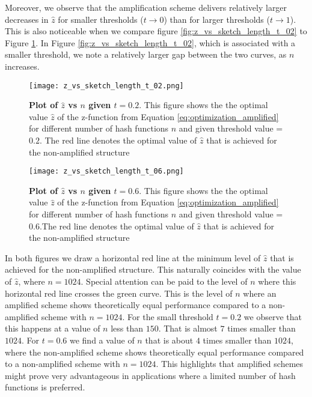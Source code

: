 Moreover, we observe that the amplification scheme delivers relatively larger decreases in $\hat{z}$ for smaller thresholds ($t \rightarrow 0$) than for larger thresholds ($t \rightarrow 1$).  This is also noticeable when we compare figure \ref{fig:z_vs_sketch_length_t_02} to Figure \ref{fig:z_vs_sketch_length_t_06}. In Figure \ref{fig:z_vs_sketch_length_t_02}, which is associated with a smaller threshold, we note a relatively larger gap between the two curves, as $n$ increases.
\begin{figure}
    \centering
    \begin{minipage}[b]{0.49\textwidth}
    \texttt{[image: z\_vs\_sketch\_length\_t\_02.png]}
    \caption[Plot of $\hat{z}$ vs $n$ given $t=0.2$]{\textbf{Plot of $\hat{z}$ vs $n$ given $t=0.2$}. This figure shows the the optimal value $\hat{z}$ of the z-function from Equation \ref{eq:optimization_amplified} for different number of hash functions $n$ and given threshold value = $0.2$. The red line denotes the optimal value of $\hat{z}$ that is achieved for the non-amplified structure}
    \label{fig:z_vs_sketch_length_t_02}
    \end{minipage}
    \hfill 
    \begin{minipage}[b]{0.49\textwidth}
    \texttt{[image: z\_vs\_sketch\_length\_t\_06.png]}
    \caption[Plot of $\hat{z}$ vs $n$ given $t=0.6$]{\textbf{Plot of $\hat{z}$ vs $n$ given $t=0.6$}. This figure shows the the optimal value $\hat{z}$ of the z-function from Equation \ref{eq:optimization_amplified} for different number of hash functions $n$ and given threshold value = $0.6$.The red line denotes the optimal value of $\hat{z}$ that is achieved for the non-amplified structure}
    \label{fig:z_vs_sketch_length_t_06}
\end{minipage}
\end{figure}

In both figures we draw a horizontal red line at the minimum level of $\hat{z}$ that is achieved for the non-amplified structure. This naturally coincides with the value of $\hat{z}$, where $n=1024$. Special attention can be paid to the level of $n$ where this horizontal red line crosses the green curve. This is the level of $n$ where an amplified scheme shows theoretically equal performance compared to a non-amplified scheme with $n=1024$. For the small threshold $t=0.2$ we observe that this happens at a value of $n$ less than $150$. That is almost $7$ times smaller than $1024$. For $t=0.6$ we find a value of $n$ that is about $4$ times smaller than $1024$, where the non-amplified scheme shows theoretically equal performance compared to a non-amplified scheme with $n=1024$. This highlights that amplified schemes might prove very advantageous in applications where a limited number of hash functions is preferred.

